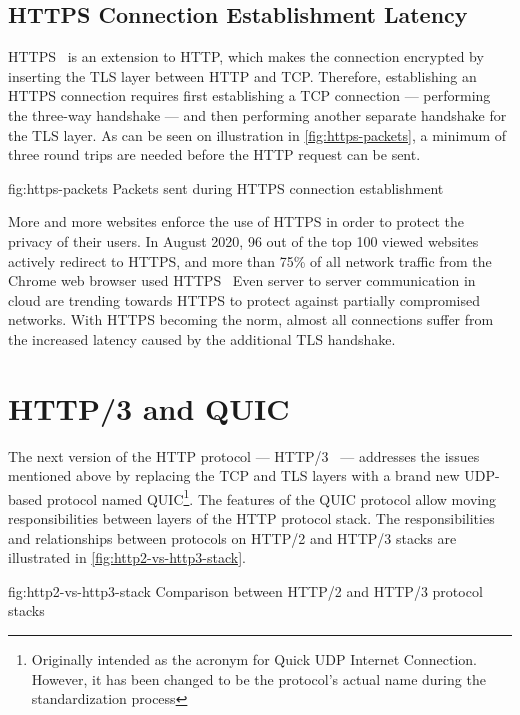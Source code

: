\subsection*{HTTPS Connection Establishment Latency}

HTTPS~\cite{rfc2818} is an extension to HTTP, which makes the connection encrypted by inserting the
TLS layer between HTTP and TCP. Therefore, establishing an HTTPS connection requires first
establishing a TCP connection --- performing the three-way handshake --- and then performing another
separate handshake for the TLS layer. As can be seen on illustration in \autoref{fig:https-packets},
a minimum of three round trips are needed before the HTTP request can be sent.

\begin{myFigure}
  {fig:https-packets}
  {Packets sent during HTTPS connection establishment}

  

\end{myFigure}

More and more websites enforce the use of HTTPS in order to protect the privacy of their users. In
August 2020, 96 out of the top 100 viewed websites actively redirect to HTTPS, and more than 75\% of
all network traffic from the Chrome web browser used HTTPS~\cite{googleTransparency} Even server to
server communication in cloud are trending towards HTTPS to protect against partially compromised
networks. With HTTPS becoming the norm, almost all connections suffer from the increased latency
caused by the additional TLS handshake.

\section{HTTP/3 and QUIC}

The next version of the HTTP protocol --- HTTP/3~\cite{draft-ietf-quic-http} --- addresses the issues
mentioned above by replacing the TCP and TLS layers with a brand new UDP-based protocol named
QUIC\footnote{Originally intended as the acronym for Quick UDP Internet Connection. However, it has
been changed to be the protocol's actual name during the standardization process}. The features of
the QUIC protocol allow moving responsibilities between layers of the HTTP protocol stack. The
responsibilities and relationships between protocols on HTTP/2 and HTTP/3 stacks are illustrated in
\autoref{fig:http2-vs-http3-stack}.

\begin{myFigure}
  {fig:http2-vs-http3-stack}
  {Comparison between HTTP/2 and HTTP/3 protocol stacks}

  

\end{myFigure}

